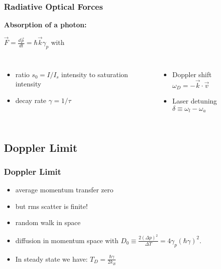 \documentclass[aspectratio=169]{beamer}
\begin{document}
\begin{frame}
  \frametitle{Radiative Optical Forces}
     \begin{center}
       \textbf{Absorption of a photon:}
     
       \medskip     
       {\Large $\vec{F} = \frac{d\vec{p}}{dt} = \hbar \vec{k} \gamma_p $} \quad with 
     
       \smallskip
     \end{center}
     
     \begin{columns}
         \begin{itemize}
           \item ratio $s_0=I/I_s$ intensity to saturation intensity
           \item decay rate $\gamma = 1/\tau$
         \end{itemize}
         \begin{itemize}
           \item Doppler shift $\omega_D = -\vec{k} \cdot \vec{v}$
           \item Laser detuning $\delta \equiv \omega_l - \omega_a$
         \end{itemize}
         \medskip
           
     \end{columns} 
\end{frame}

\subsection{Doppler Limit}
\begin{frame}
  \frametitle{Doppler Limit}
  \begin{itemize}
    \item average momentum transfer zero
    \item but \alert{rms scatter is finite!}
    \item random walk in space 
    \item<2-> diffusion in momentum space with $D_0 \equiv \frac{2(\Delta p)^2}{\Delta T} = 4 \gamma_p(\hbar\gamma)^2$. 
    \item<2-> In steady state we have: $T_D = \frac{\hbar\gamma }{2 k_B}$
  \end{itemize}
\end{frame}
\end{document}
